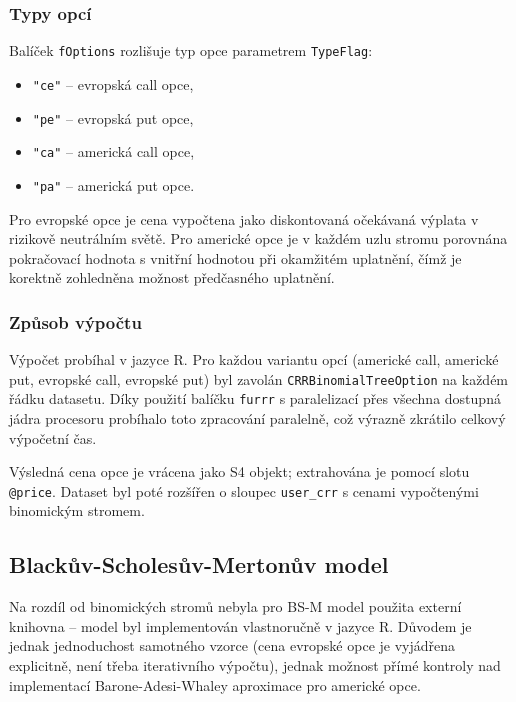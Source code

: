 \subsubsection{Typy opcí}

Balíček \texttt{fOptions} rozlišuje typ opce parametrem \texttt{TypeFlag}:
\begin{itemize}
  \item \texttt{"ce"} -- evropská call opce,
  \item \texttt{"pe"} -- evropská put opce,
  \item \texttt{"ca"} -- americká call opce,
  \item \texttt{"pa"} -- americká put opce.
\end{itemize}

Pro evropské opce je cena vypočtena jako diskontovaná očekávaná výplata v rizikově neutrálním světě. Pro americké opce je v každém uzlu stromu porovnána pokračovací hodnota s vnitřní hodnotou při okamžitém uplatnění, čímž je korektně zohledněna možnost předčasného uplatnění.

\subsubsection{Způsob výpočtu}

Výpočet probíhal v jazyce R. Pro každou variantu opcí (americké call, americké put, evropské call, evropské put) byl zavolán \texttt{CRRBinomialTreeOption} na každém řádku datasetu. Díky použití balíčku \texttt{furrr} s paralelizací přes všechna dostupná jádra procesoru probíhalo toto zpracování paralelně, což výrazně zkrátilo celkový výpočetní čas.

Výsledná cena opce je vrácena jako S4 objekt; extrahována je pomocí slotu \texttt{@price}. Dataset byl poté rozšířen o sloupec \texttt{user\_crr} s cenami vypočtenými binomickým stromem.

\subsection{Blackův-Scholesův-Mertonův model}

Na rozdíl od binomických stromů nebyla pro BS-M model použita externí knihovna – model byl implementován vlastnoručně v jazyce R. Důvodem je jednak jednoduchost samotného vzorce (cena evropské opce je vyjádřena explicitně, není třeba iterativního výpočtu), jednak možnost přímé kontroly nad implementací Barone-Adesi-Whaley aproximace pro americké opce.

